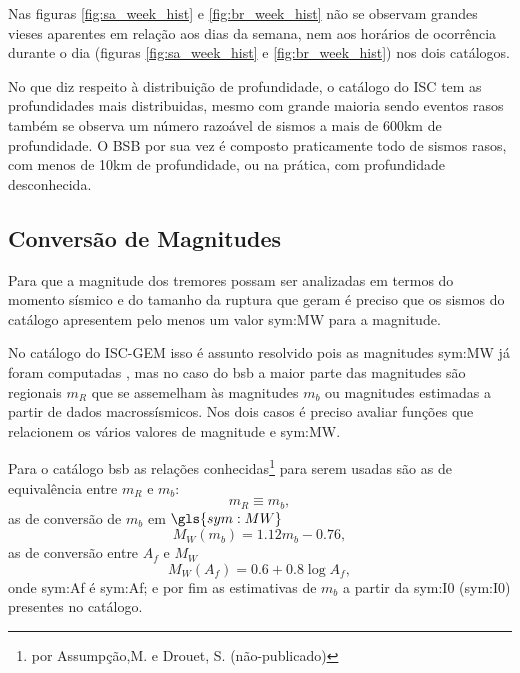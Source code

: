 Nas figuras \ref{fig:sa_week_hist} e \ref{fig:br_week_hist} não se observam grandes vieses aparentes 
em relação aos dias da semana, nem aos horários de ocorrência durante o dia 
(figuras \ref{fig:sa_week_hist} e \ref{fig:br_week_hist}) nos dois catálogos.

No que diz respeito à distribuição de profundidade, o catálogo do ISC tem as
profundidades mais distribuidas, mesmo com grande maioria sendo eventos rasos 
também se observa um número razoável de sismos a mais de 600km de profundidade.
O BSB por sua vez é composto praticamente todo de sismos rasos, com menos de 10km
de profundidade, ou na prática, com profundidade desconhecida.



\subsection{Conversão de Magnitudes}
\label{sec:mag_conv}

Para que a magnitude dos tremores possam ser analizadas em termos do momento sísmico e do 
tamanho da ruptura que geram é preciso que os sismos do catálogo apresentem pelo menos um valor
\gls{sym:MW} para a magnitude.

No catálogo do ISC-GEM isso é assunto resolvido pois as magnitudes \gls{sym:MW} já foram computadas \citep{storchak_2013}, mas no
caso do \gls{bsb} a maior parte das magnitudes são regionais $m_R$ que se assemelham às magnitudes $m_b$ 
ou magnitudes estimadas a partir de dados macrossísmicos. Nos dois casos é preciso avaliar funções que relacionem os
vários valores de magnitude e \gls{sym:MW}.

Para o catálogo \gls{bsb} as relações conhecidas\footnote{por Assumpção,M. e Drouet, S. (não-publicado)} para serem
usadas são as de equivalência entre $m_R$ e $m_b$:
\begin{equation}
	\ensuremath{
		m_R \equiv m_b,
	}
\label{eq:mrmb}
\end{equation}
as de conversão de $m_b$ em $\gls{sym:MW}$
\begin{equation}
	\ensuremath{
		M_W(m_b) = 1.12 m_b - 0.76,
	}
\label{eq:mwmb}
\end{equation}
as de conversão entre $A_f$ e $M_W$
\begin{equation}
	\ensuremath{
		M_W(A_f) = 0.6 + 0.8\log A_f,
	}
\label{eq:mwaf}
\end{equation}
onde \gls{sym:Af} é \glsdesc{sym:Af}; e por fim as estimativas de $m_b$ a partir da \glsdesc{sym:I0} (\gls{sym:I0})
presentes no catálogo.

